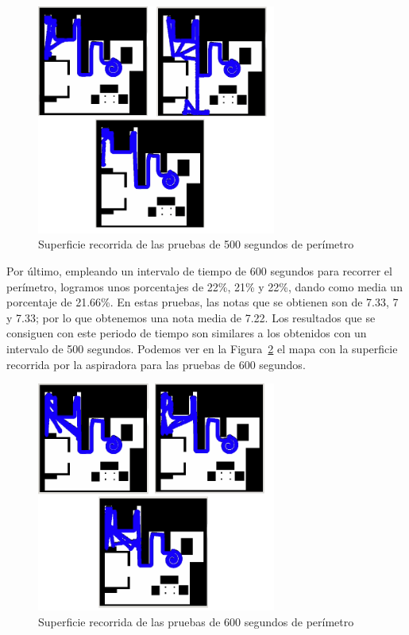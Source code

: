 \begin{figure}[H]
  \begin{center}
    \includegraphics[width=0.7\textwidth]{figures/Vacuum/Referee500.png}
		\caption{Superficie recorrida de las pruebas de 500 segundos de perímetro}
		\label{fig.Referee500}
		\end{center}
\end{figure}

Por último, empleando un intervalo de tiempo de 600 segundos para recorrer el perímetro, logramos unos porcentajes de 22\%, 21\% y 22\%, dando como media un porcentaje de 21.66\%. En estas pruebas, las notas que se obtienen son de 7.33, 7 y 7.33; por lo que obtenemos una nota media de 7.22. Los resultados que se consiguen con este periodo de tiempo son similares a los obtenidos con un intervalo de 500 segundos. Podemos ver en la Figura~\ref{fig.Referee600} el mapa con la superficie recorrida por la aspiradora para las pruebas de 600 segundos. \\

\begin{figure}[H]
  \begin{center}
    \includegraphics[width=0.7\textwidth]{figures/Vacuum/Referee600.png}
		\caption{Superficie recorrida de las pruebas de 600 segundos de perímetro}
		\label{fig.Referee600}
		\end{center}
\end{figure}

